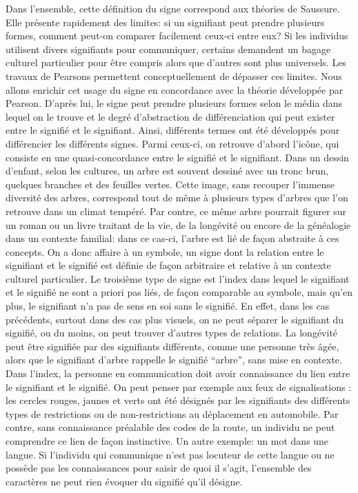 Dans l'ensemble, cette définition du signe correspond aux théories de Saussure.
Elle présente rapidement des limites: si un signifiant peut prendre plusieurs formes, comment peut-on comparer facilement ceux-ci entre eux?
Si les individus utilisent divers signifiants pour communiquer, certains demandent un bagage culturel particulier pour être compris alors que d'autres sont plus universels.
Les travaux de Pearsons permettent conceptuellement de dépasser ces limites.
Nous allons enrichir cet usage du signe en concordance avec la théorie développée par Pearson.
D'après lui, le signe peut prendre plusieurs formes selon le média dans lequel on le trouve et le degré d'abstraction de différenciation qui peut exister entre le signifié et le signifiant.
Ainsi, différents termes ont été développés pour différencier les différents signes.
Parmi ceux-ci, on retrouve d'abord l'icône, qui consiste en une quasi-concordance entre le signifié et le signifiant.
Dans un dessin d'enfant, selon les cultures, un arbre est souvent dessiné avec un tronc brun, quelques branches et des feuilles vertes.
Cette image, sans recouper l'immense diversité des arbres, correspond tout de même à plusieurs types d'arbres que l'on retrouve dans un climat tempéré.
Par contre, ce même arbre pourrait figurer sur un roman ou un livre traitant de la vie, de la longévité ou encore de la généalogie dans un contexte familial: dans ce cas-ci, l'arbre est lié de façon abstraite à ces concepts.
On a donc affaire à un symbole, un signe dont la relation entre le signifiant et le signifié est définie de façon arbitraire et relative à un contexte culturel particulier.
Le troisième type de signe est l'index dans lequel le signifiant et le signifié ne sont a priori pas liés, de façon comparable au symbole, mais qu'en plus, le signifiant n'a pas de sens en soi sans le signifié.
En effet, dans les cas précédents, surtout dans des cas plus visuels, on ne peut séparer le signifiant du signifié, ou du moins, on peut trouver d'autres types de relations.
La longévité peut être signifiée par des signifiants différents, comme une personne très âgée, alors que le signifiant d'arbre rappelle le signifié \enquote{arbre}, sans mise en contexte.
Dans l'index, la personne en communication doit avoir connaissance du lien entre le signifiant et le signifié.
On peut penser par exemple aux feux de signalisations : les cercles rouges, jaunes et verts ont été désignés par les signifiants des différents types de restrictions ou de non-restrictions au déplacement en automobile.
Par contre, sans connaissance préalable des codes de la route, un individu ne peut comprendre ce lien de façon instinctive.
Un autre exemple: un mot dans une langue.
Si l'individu qui communique n'est pas locuteur de cette langue ou ne possède pas les connaissances pour saisir de quoi il s'agit, l'ensemble des caractères ne peut rien évoquer du signifié qu'il désigne.

